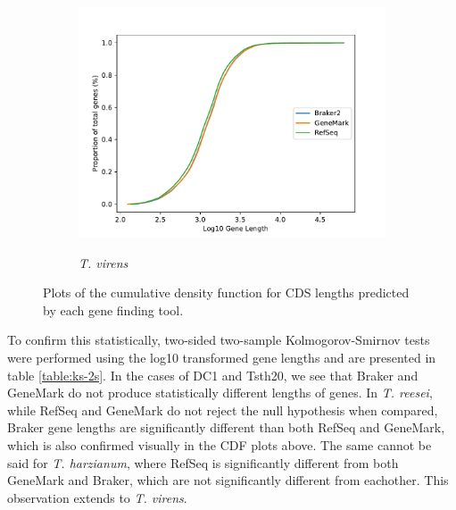 \begin{figure}
  \ContinuedFloat
  \centering
  \begin{subfigure}{0.7\textwidth}
    \includegraphics[width=\textwidth]{figures/t-virens-cdf-lengths-log.pdf}
    \label{fig:tvirens-lengths}
    \caption{\textit{T. virens}}
  \end{subfigure}
  \label{fig:cdf-lengths}
  \caption[Cumulative Density Function of Gene Lengths]{Plots of the
    cumulative density function for CDS lengths predicted by each gene
    finding tool.}
\end{figure}

To confirm this statistically, two-sided two-sample Kolmogorov-Smirnov
tests were performed using the log10 transformed gene lengths and are
presented in table \ref{table:ks-2s}. In the cases of DC1 and Tsth20,
we see that Braker and GeneMark do not produce statistically different
lengths of genes. In \textit{T. reesei}, while RefSeq and GeneMark do
not reject the null hypothesis when compared, Braker gene lengths are
significantly different than both RefSeq and GeneMark, which is also
confirmed visually in the CDF plots above. The same cannot be said for
\textit{T. harzianum}, where RefSeq is significantly different from
both GeneMark and Braker, which are not significantly different from
eachother. This observation extends to \textit{T. virens}.

